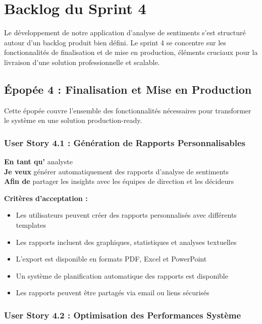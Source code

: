 \section{Backlog du Sprint 4}

Le développement de notre application d'analyse de sentiments s'est structuré autour d'un backlog produit bien défini. Le sprint 4 se concentre sur les fonctionnalités de finalisation et de mise en production, éléments cruciaux pour la livraison d'une solution professionnelle et scalable.

\subsection{Épopée 4 : Finalisation et Mise en Production}

Cette épopée couvre l'ensemble des fonctionnalités nécessaires pour transformer le système en une solution production-ready.

\subsubsection{User Story 4.1 : Génération de Rapports Personnalisables}

\textbf{En tant qu'} analyste \\
\textbf{Je veux} générer automatiquement des rapports d'analyse de sentiments \\
\textbf{Afin de} partager les insights avec les équipes de direction et les décideurs

\textbf{Critères d'acceptation :}
\begin{itemize}
    \item Les utilisateurs peuvent créer des rapports personnalisés avec différents templates
    \item Les rapports incluent des graphiques, statistiques et analyses textuelles
    \item L'export est disponible en formats PDF, Excel et PowerPoint
    \item Un système de planification automatique des rapports est disponible
    \item Les rapports peuvent être partagés via email ou liens sécurisés
\end{itemize}

\subsubsection{User Story 4.2 : Optimisation des Performances Système}

